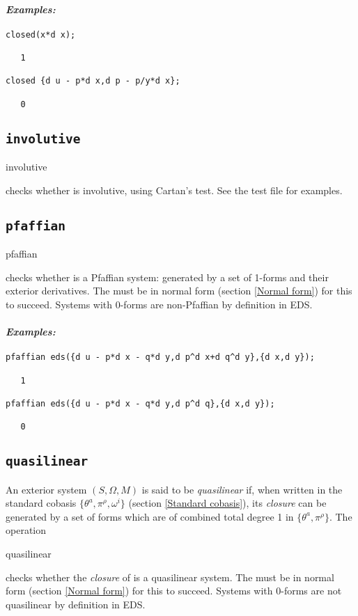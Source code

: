 \paragraph{\it Examples:}
\begin{verbatim}
closed(x*d x);

   1

closed {d u - p*d x,d p - p/y*d x};

   0
\end{verbatim}

\subsection{\tt involutive}
\label{involutive}

\begin{syntax}
	involutive 
\end{syntax}
checks whether  is involutive, using Cartan's test. See the test
file for examples.

\subsection{\tt pfaffian}
\label{pfaffian}

\begin{syntax}
	pfaffian 
\end{syntax}
checks whether  is a Pfaffian system: generated by a set of
1-forms and their exterior derivatives. The  must be in normal
form (section \ref{Normal form}) for this to succeed. Systems with 0-forms
are non-Pfaffian by definition in EDS.

\paragraph{\it Examples:}
\begin{verbatim}
pfaffian eds({d u - p*d x - q*d y,d p^d x+d q^d y},{d x,d y});

   1

pfaffian eds({d u - p*d x - q*d y,d p^d q},{d x,d y});

   0
\end{verbatim}

\subsection{\tt quasilinear}
\label{quasilinear}

An exterior system $(S,\Omega,M)$ is said to be {\em quasilinear} if, when
written in the standard cobasis $\{\theta^a,\pi^\rho,\omega^i\}$ (section
\ref{Standard cobasis}), its {\em closure} can be generated by a set of
forms which are of combined total degree 1 in $\{\theta^a,\pi^\rho\}$. The
operation
\begin{syntax}
	quasilinear 
\end{syntax}
checks whether the {\em closure} of  is a quasilinear system. The
 must be in normal form (section \ref{Normal form}) for this to
succeed. Systems with 0-forms are not quasilinear by definition in EDS.

